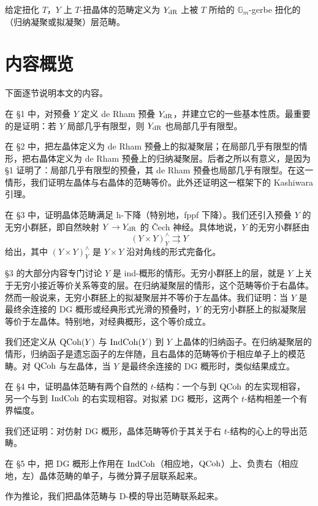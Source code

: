 给定扭化 $T$，$Y$ 上 $T$-扭晶体的范畴定义为 $Y_{\mathrm{dR}}$ 上被 $T$ 所给的 $\mathbb{G}_m$-gerbe 扭化的（归纳凝聚或拟凝聚）层范畴。

\section{内容概览}

下面逐节说明本文的内容。

在 §1 中，对预叠 $Y$ 定义 de Rham 预叠 $Y_{\mathrm{dR}}$，并建立它的一些基本性质。最重要的是证明：若 $Y$ 局部几乎有限型，则 $Y_{\mathrm{dR}}$ 也局部几乎有限型。

在 §2 中，把左晶体定义为 de Rham 预叠上的拟凝聚层；在局部几乎有限型的情形，把右晶体定义为 de Rham 预叠上的归纳凝聚层。后者之所以有意义，是因为 §1 证明了：局部几乎有限型的预叠，其 de Rham 预叠也局部几乎有限型。在这一情形，我们证明左晶体与右晶体的范畴等价。此外还证明这一框架下的 Kashiwara 引理。

在 §3 中，证明晶体范畴满足 h-下降（特别地，fppf 下降）。我们还引入预叠 $Y$ 的无穷小群胚，即自然映射 $Y\to Y_{\mathrm{dR}}$ 的 Čech 神经。具体地说，$Y$ 的无穷小群胚由
\[
(Y\times Y)^\wedge_Y\rightrightarrows Y
\]
给出，其中 $(Y\times Y)^\wedge_Y$ 是 $Y\times Y$ 沿对角线的形式完备化。

§3 的大部分内容专门讨论 $Y$ 是 ind-概形的情形。无穷小群胚上的层，就是 $Y$ 上关于无穷小接近等价关系等变的层。在归纳凝聚层的情形，这个范畴等价于右晶体。然而一般说来，无穷小群胚上的拟凝聚层并不等价于左晶体。我们证明：当 $Y$ 是最终余连接的 DG 概形或经典形式光滑的预叠时，$Y$ 的无穷小群胚上的拟凝聚层等价于左晶体。特别地，对经典概形，这个等价成立。

我们还定义从 $\mathrm{QCoh}(Y)$ 与 $\mathrm{IndCoh}(Y)$ 到 $Y$ 上晶体的归纳函子。在归纳凝聚层的情形，归纳函子是遗忘函子的左伴随，且右晶体的范畴等价于相应单子上的模范畴。对 $\mathrm{QCoh}$ 与左晶体，当 $Y$ 是最终余连接的 DG 概形时，类似结果成立。

在 §4 中，证明晶体范畴有两个自然的 $t$-结构：一个与到 $\mathrm{QCoh}$ 的左实现相容，另一个与到 $\mathrm{IndCoh}$ 的右实现相容。对拟紧 DG 概形，这两个 $t$-结构相差一个有界幅度。

我们还证明：对仿射 DG 概形，晶体范畴等价于其关于右 $t$-结构的心上的导出范畴。

在 §5 中，把 DG 概形上作用在 $\mathrm{IndCoh}$（相应地，$\mathrm{QCoh}$）上、负责右（相应地，左）晶体范畴的单子，与微分算子层联系起来。

作为推论，我们把晶体范畴与 D-模的导出范畴联系起来。

